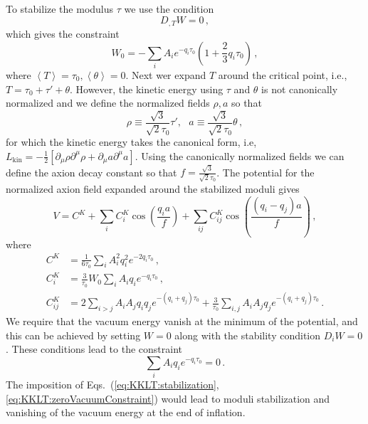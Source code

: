 \documentclass[12pt]{article}
\begin{document}
To stabilize the modulus $\tau$ we use the condition~\cite{Nath:1983aw}
\begin{equation} \label{eq:KKLT:stabilization}
  D_{,T} W = 0\,,
\end{equation}
which gives the constraint
\begin{equation} \label{eq:KKLT:W0}
  W_0 = -\sum_i A_i e^{-q_i \tau_0} \left(1 + \frac{2}{3} q_i \tau_0\right)\,,
\end{equation}
where $\left<T\right> = \tau_0, \left<\theta\right> = 0$.
Next wer expand $T$ around the critical point, i.e., $T = \tau_0 + \tau' + \theta$.
However, the kinetic energy using $\tau$ and $\theta$ is not canonically normalized and we define the normalized fields $\rho, a$ so that
\begin{equation} \label{eq:KKLT:rho.a}
  \rho \equiv \frac{\sqrt 3}{\sqrt{2} \tau_0} \tau',
  ~~~ a \equiv \frac{\sqrt 3}{\sqrt{2} \tau_0} \theta\,,
\end{equation}
for which the kinetic energy takes the canonical form, i.e, $L_\text{kin} = -\frac{1}{2} \left[\partial_\mu \rho \partial^\mu \rho + \partial_\mu a \partial^\mu a\right]$.
Using the canonically normalized fields we can define the axion decay constant so that $f = \frac{\sqrt 3}{\sqrt{2} \tau_0}$.
The potential for the normalized axion field expanded around the stabilized moduli gives
\begin{equation} \label{eq:KKLT:Vslow}
  V = C^K
    + \sum_i C^K_i \cos\left(\frac{q_i a}{f}\right)
    + \sum_{ij} C^K_{ij} \cos\left(\frac{\left(q_i - q_j\right) a}{f}\right)\,,
\end{equation}
where
\begin{equation} \label{eq:KKLT:VslowCoefficients}
  \begin{aligned}
    C^K &= \frac{1}{6 \tau_0} \sum_i A^2_i q^2_i e^{-2 q_i \tau_0}\,,\\
    C^K_i &= \frac{3}{\tau_0} W_0 \sum_i A_i q_i e^{-q_i \tau_0}\,,\\
    C^K_{ij} &= 2 \sum_{i > j} A_i A_j q_i q_j e^{-\left(q_i + q_j\right) \tau_0}
      + \frac{3}{\tau_0} \sum_{i, j} A_i A_j q_j e^{-\left(q_i + q_j\right) \tau_0}\,.
  \end{aligned}
\end{equation}
We require that the vacuum energy vanish at the minimum of the potential, and this can be achieved by setting $W = 0$ along with the stability condition $D_i W = 0$.
These conditions lead to the constraint
\begin{equation} \label{eq:KKLT:zeroVacuumConstraint}
  \sum_i A_i q_i e^{-q_i \tau_0} = 0\,.
\end{equation}
The imposition of Eqs.~(\ref{eq:KKLT:stabilization}, \ref{eq:KKLT:zeroVacuumConstraint}) would lead to moduli stabilization and vanishing of the vacuum energy at the end of inflation.
\end{document}
